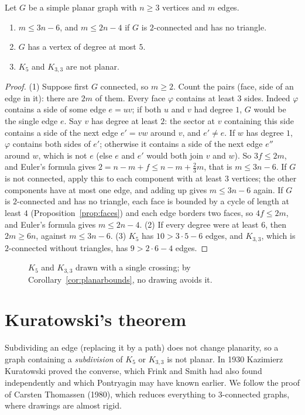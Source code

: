 \begin{corollary}\label{cor:planarbounds}
Let $G$ be a simple planar graph with $n\ge3$ vertices and $m$ edges.
\begin{enumerate}
\item $m\le3n-6$, and $m\le2n-4$ if $G$ is $2$-connected and has no triangle.
\item $G$ has a vertex of degree at most $5$.
\item $K_5$ and $K_{3,3}$ are not planar.
\end{enumerate}
\end{corollary}
\begin{proof}
(1) Suppose first $G$ connected, so $m\ge2$. Count the pairs (face, side of an edge in it): there
are $2m$ of them. Every face $\varphi$ contains at least $3$ sides. Indeed $\varphi$ contains a side of some edge $e=uv$; if both $u$ and $v$ had degree $1$, $G$ would be
the single edge $e$. Say $v$ has degree at least $2$: the sector at $v$ containing this side contains a side of the next edge $e'=vw$ around $v$, and $e'\ne e$. If $w$ has
degree $1$, $\varphi$ contains both sides of $e'$; otherwise it contains a side of the next edge $e''$ around $w$, which is not $e$ (else $e$ and $e'$ would both join $v$ and $w$).
So $3f\le2m$, and Euler's formula gives $2=n-m+f\le n-m+\frac23m$, that is $m\le3n-6$. If $G$ is not connected, apply this to each component with at least $3$
vertices; the other components have at most one edge, and adding up gives $m\le3n-6$ again. If $G$ is $2$-connected and has no triangle, each face is bounded by a
cycle of length at least $4$ (Proposition~\ref{prop:faces}) and each edge borders two faces, so $4f\le2m$, and Euler's formula gives $m\le2n-4$.
(2) If every degree were at least $6$, then $2m\ge6n$, against $m\le3n-6$.
(3) $K_5$ has $10>3\cdot5-6$ edges, and $K_{3,3}$, which is $2$-connected without triangles, has $9>2\cdot6-4$ edges.
\end{proof}

\begin{figure}[ht]
\centering
{}
\caption{$K_5$ and $K_{3,3}$ drawn with a single crossing; by Corollary~\ref{cor:planarbounds}, no drawing avoids it.}
\label{fig:k5k33}
\end{figure}

\section{Kuratowski's theorem}

Subdividing an edge (replacing it by a path) does not change planarity, so a graph containing a \emph{subdivision} of $K_5$ or $K_{3,3}$ is not planar.
In 1930 Kazimierz Kuratowski proved the converse, which Frink and Smith had also found independently and which Pontryagin may have
known earlier. We follow the proof of Carsten Thomassen (1980), which reduces everything to $3$-connected graphs, where drawings are
almost rigid.

